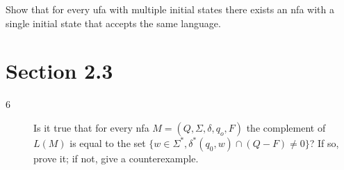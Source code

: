 \documentclass[12pt]{article}
\begin{document}
\begin{description}
        Show that for every ufa with multiple initial states there exists an
        nfa with a single initial state that accepts the same language.
\end{description}

\section*{Section 2.3}
\begin{description}
    \item[6] Is it true that for every nfa
        $M = (Q, \Sigma, \delta, q_o, F)$ the complement of $L(M)$ is
        equal to the set 
        $\{w \in \Sigma^*, \delta^*(q_0, w) \cap (Q - F) \ne 0\}$?
        If so, prove it; if not, give a counterexample.
\end{description}
\end{document}
